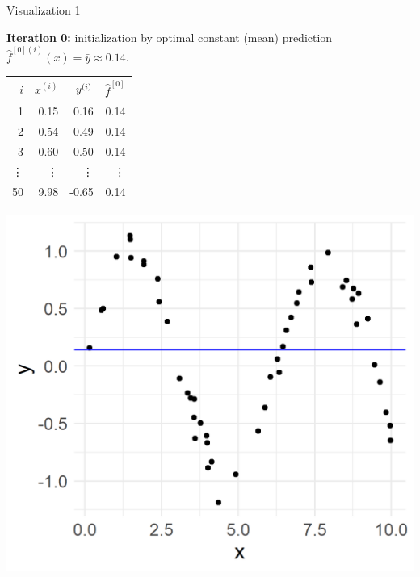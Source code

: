 \begin{vbframe}{Visualization 1}
\begin{footnotesize}
\framebreak



\textbf{Iteration 0:} initialization by optimal constant (mean) prediction 
$\hat f^{[0](i)}(x) = \bar{y} \approx 0.14$.

\vfill

\begin{minipage}[c]{0.35\textwidth}
  \vspace{0pt}%
  \scriptsize
  \centering
  \begin{tabular}{r|r|r|r}
    $i$ & $x^{(i)}$ & $y^{(i)}$ & $\hat{f}^{[0]}$ \\
    \hline
    1 & 0.15 & 0.16 & 0.14\\
    2 & 0.54 & 0.49 & 0.14\\
    3 & 0.60 & 0.50 & 0.14\\
    \vdots & \vdots & \vdots & \vdots \\
    50 & 9.98 & -0.65 & 0.14\\
  \end{tabular}
\end{minipage}%
\begin{minipage}[c]{0.05\textwidth}
  \phantom{foo}
\end{minipage}%
\begin{minipage}[c]{0.6\textwidth}
  \vspace{0pt}%
  \includegraphics{figure/gbm_anim_init.png}
\end{minipage}%


\end{footnotesize}
\end{vbframe}
